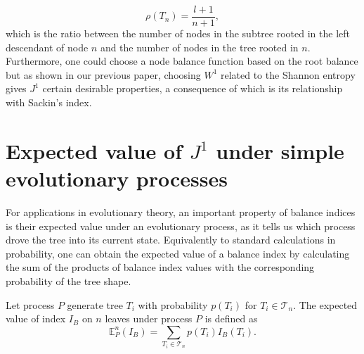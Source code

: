 \begin{equation}
    \rho(T_n) = \frac{l+1}{n+1},
\end{equation}
which is the ratio between the number of nodes in the subtree rooted in the left descendant of node $n$ and the number of nodes in the tree rooted in $n$. Furthermore, one could choose a node balance function based on the root balance but as shown in our previous paper, choosing $W^1$ related to the Shannon entropy gives $J^1$ certain desirable properties, a consequence of which is its relationship with Sackin's index. \par
\fi


\section{Expected value of $J^1$ under simple evolutionary processes}\label{expsection}
For applications in evolutionary theory, an important property of balance indices is their expected value under an evolutionary process, as it tells us which process drove the tree into its current state. Equivalently to standard calculations in probability, one can obtain the expected value of a balance index by calculating the sum of the products of balance index values with the corresponding probability of the tree shape.
\begin{definition}
Let process $P$ generate tree $T_i$ with probability $p(T_i)$ for $T_i\in\mathcal{T}_n$. The expected value of index $I_B$ on $n$ leaves under process $P$ is defined as
    \begin{equation}\label{expvaldef}
        \mathbb{E}_P^n(I_B) = \sum_{T_i\in\mathcal{T}_n} p(T_i)I_B(T_i).
    \end{equation}
\end{definition}

